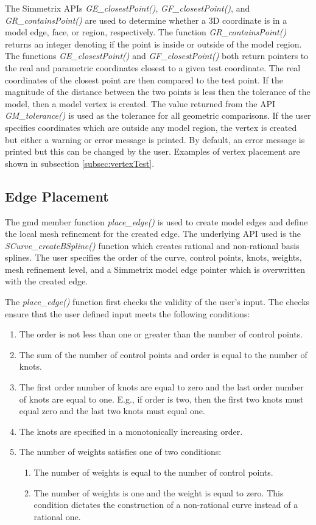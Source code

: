 \documentclass[a4paper, 12pt]{article}
\begin{document}
The Simmetrix APIs \emph{GE\_closestPoint()}, \emph{GF\_closestPoint()}, 
and \emph{GR\_containsPoint()} are used to determine whether a 3D coordinate 
is in a model edge, face, or region, respectively. The function \emph{GR\_containsPoint()}
returns an integer denoting if the point is inside or outside of the model region. 
The functions \emph{GE\_closestPoint()} and \emph{GF\_closestPoint()} both return 
pointers to the real and parametric coordinates closest to a given test coordinate. 
The real coordinates of the closest point are then compared to the test point.
If the magnitude of the distance between the two points is less then the 
tolerance of the model, then a model vertex is created. 
The value returned from the API \emph{GM\_tolerance()} is used as the 
tolerance for all geometric comparisons. If the user specifies coordinates
which are outside any model region, the vertex is created but either a 
warning or error message is printed. By default, an error message is printed
but this can be changed by the user. Examples of vertex placement
are shown in subsection \ref{subsec:vertexTest}.

\subsection{Edge Placement} \label{subsec:edge}
The gmd member function \emph{place\_edge()} is used to create model edges and 
define the local mesh refinement for the created edge. The underlying API used
is the \emph{SCurve\_createBSpline()} function which creates rational and non-rational
basis splines. The user specifies the order of the curve, control points, knots,
weights, mesh refinement level, and a Simmetrix model edge pointer which is 
overwritten with the created edge. 

The \emph{place\_edge()} function first checks the validity of the user's input.
The checks ensure that the user defined input meets the following conditions:
\begin{enumerate}
  \item The order is not less than one or greater than the number of control points.
  \item The sum of the number of control points and order is equal to 
      the number of knots.
  \item The first order number of knots are equal to zero and the last order number 
      of knots are equal to one. E.g., if order is two, then the first two 
      knots must equal zero and the last two knots must equal one.
  \item The knots are specified in a monotonically increasing order. 
  \item The number of weights satisfies one of two conditions:
    \begin{enumerate}
      \item The number of weights is equal to the number of control points.
      \item The number of weights is one and the weight is equal to zero. 
          This condition dictates the construction of a non-rational curve
          instead of a rational one.
    \end{enumerate}
\end{enumerate}
\end{document}
